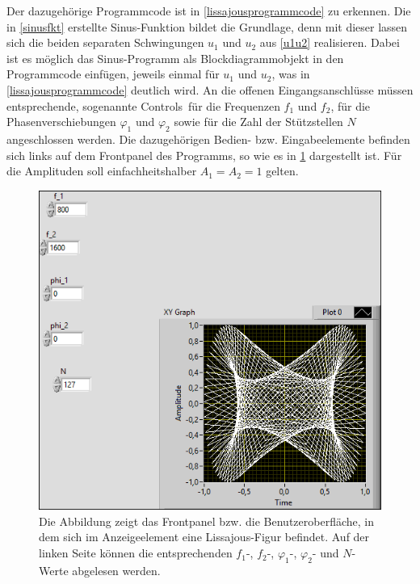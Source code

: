 \documentclass[
a4paper,
12pt,
pagesize,
ngerman
]{scrartcl}
\begin{document}
	\noindent Der dazugehörige Programmcode ist in \cref{lissajousprogrammcode} zu erkennen. Die in \cref{sinusfkt} erstellte Sinus-Funktion bildet die Grundlage, denn mit dieser lassen sich die beiden separaten Schwingungen $u_1$ und $u_2$ aus \cref{u1u2} realisieren. Dabei ist es möglich das Sinus-Programm als Blockdiagrammobjekt in den Programmcode einfügen, jeweils einmal für $u_1$ und $u_2$, was in \cref{lissajousprogrammcode} deutlich wird. An die offenen Eingangsanschlüsse müssen entsprechende, sogenannte \glqq Controls\grqq\ für die Frequenzen $f_1$ und $f_2$, für die Phasenverschiebungen $\varphi_1$ und $\varphi_2$ sowie für die Zahl der Stützstellen $N$ angeschlossen werden. Die dazugehörigen Bedien- bzw. Eingabeelemente befinden sich links auf dem Frontpanel des Programms, so wie es in \cref{lissajous} dargestellt ist. Für die Amplituden soll einfachheitshalber $A_1 = A_2 = 1$ gelten.

	\begin{figure}[H]
		\centering
		\includegraphics[width=1.0\textwidth]{EIRE2018Dateien/Tag1/lissajous-bilder/Lissajousp}
		\caption{Die Abbildung zeigt das Frontpanel bzw. die Benutzeroberfläche, in dem sich im Anzeigeelement eine Lissajous-Figur befindet. Auf der linken Seite können die entsprechenden $f_1$-, $f_2$-, $\varphi_1$-, $\varphi_2$- und $N$-Werte abgelesen werden.}
		\label{lissajous}
	\end{figure}
\end{document}
